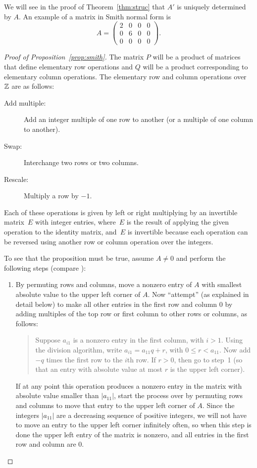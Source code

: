 We will see in the proof of Theorem~\ref{thm:struc} that
$A'$ is uniquely determined by $A$.
An example of a matrix in Smith normal form is
$$
	A=\left(\begin{matrix}
		2&0&0&0\\
		0&6&0&0\\
		0&0&0&0
	\end{matrix}\right).
$$

\begin{proof}[Proof of Proposition~\ref{prop:smith}]
The matrix $P$ will be a product of matrices that define elementary
row operations and $Q$ will be a product corresponding to elementary
column operations.  The elementary row and column operations over
$\mathbb{Z}$ are as follows:
\begin{description}
	\item[Add multiple:]
		Add an integer multiple of one row to another
		(or a multiple of one column to another).
	\item[Swap:]
		Interchange two rows or two columns.
	\item[Rescale:]
		Multiply a row by $-1$.
\end{description}
Each of these operations is given by left or right multiplying by an
invertible matrix~$E$ with integer entries, where~$E$ is the result of
applying the given operation to the identity matrix, and~$E$ is
invertible because each operation can be reversed using another row or
column operation over the integers.

To see that the proposition must be true, assume $A\neq 0$ and perform
the following steps (compare \cite[pg.~459]{artin:algebra}):
\begin{enumerate}
	\item By permuting rows and columns, move a nonzero entry of $A$ with
	smallest absolute value to the upper left corner of $A$.  Now
	``attempt'' (as explained in detail below) to make all other entries
	in the first row and column $0$ by adding multiples of the top row
	or first column to other rows or columns, as follows:
	\begin{quote}
		Suppose $a_{i1}$ is a nonzero entry in the first column, with
		$i>1$.  Using the division algorithm, write
		$a_{i1} = a_{11}q + r$, with $0\leq r < a_{11}$. Now add $-q$
		times the first row to the $i$th row. If $r>0$, then go to step~1
		(so that an entry with absolute value at most $r$ is the upper
		left corner).
	\end{quote}
	If at any point this operation produces a nonzero entry in the
	matrix with absolute value smaller than $|a_{11}|$, start the
	process over by permuting rows and columns to move that entry to the
	upper left corner of $A$.  Since the integers $|a_{11}|$ are a
	decreasing sequence of positive integers, we will not have to move
	an entry to the upper left corner infinitely often, so when this
	step is done the upper left entry of the matrix is nonzero, and all
	entries in the first row and column are $0$.
	

\end{enumerate}
\end{proof}

